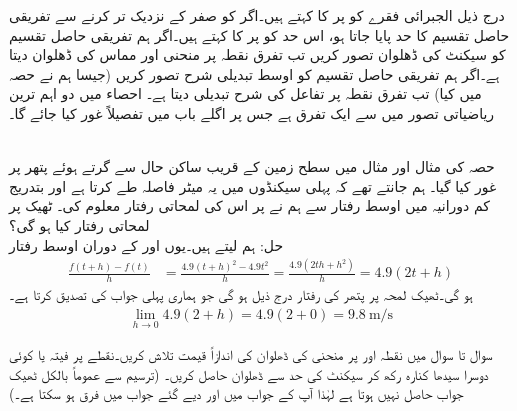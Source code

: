 درج ذیل الجبرائی فقرے کو  پر  کا   کہتے ہیں۔اگر  کو صفر کے نزدیک تر کرنے سے تفریقی حاصل تقسیم کا حد پایا جاتا ہو، اس حد کو  پر  کا  کہتے ہیں۔اگر ہم تفریقی حاصل تقسیم کو سیکنٹ کی ڈھلوان تصور کریں تب تفرق نقطہ  پر منحنی اور مماس کی ڈھلوان دیتا ہے۔اگر ہم تفریقی حاصل تقسیم کو اوسط تبدیلی شرح تصور کریں (جیسا ہم نے حصہ  میں کیا) تب تفرق نقطہ  پر تفاعل کی شرح تبدیلی دیتا ہے۔  احصاء میں دو اہم ترین ریاضیاتی تصور میں سے ایک تفرق ہے جس پر اگلے باب میں تفصیلاً غور کیا جائے گا۔

\\
حصہ  کی مثال  اور مثال  میں سطح زمین کے قریب  ساکن حال سے  گرتے ہوئے پتھر پر غور کیا گیا۔ ہم جانتے تھے کہ پہلی  سیکنڈوں میں یہ  میٹر فاصلہ طے کرتا ہے اور بتدریج کم دورانیہ میں اوسط رفتار سے  ہم نے  پر اس کی لمحاتی رفتار معلوم کی۔ ٹھیک  پر لمحاتی رفتار کیا ہو گی؟\\
حل:\quad
ہم  لیتے ہیں۔یوں  اور  کے دوران اوسط رفتار
\begin{align*}
\frac{f(t+h)-f(t)}{h}&=\frac{4.9(t+h)^2-4.9t^2}{h}=\frac{4.9(2th+h^2)}{h}=4.9(2t+h)
\end{align*}
ہو گی۔ٹھیک لمحہ  پر پتھر کی رفتار درج ذیل ہو گی جو ہماری پہلی جواب کی تصدیق کرتا ہے۔
\begin{align*}
\lim_{h\to 0} 4.9(2+h)=4.9(2+0)=\SI{9.8}{\meter\per\second}
\end{align*}

سوال  تا سوال  میں نقطہ  اور  پر منحنی کی ڈھلوان کی اندازاً قیمت تلاش کریں۔نقطے پر فیتہ یا کوئی دوسرا سیدھا کنارہ رکھ کر سیکنٹ کی حد سے ڈھلوان حاصل کریں۔ (ترسیم سے عموماً بالکل ٹھیک جواب حاصل نہیں ہوتا ہے لہٰذا آپ کے جواب میں اور دیے گئے جواب میں فرق ہو سکتا ہے۔)  

